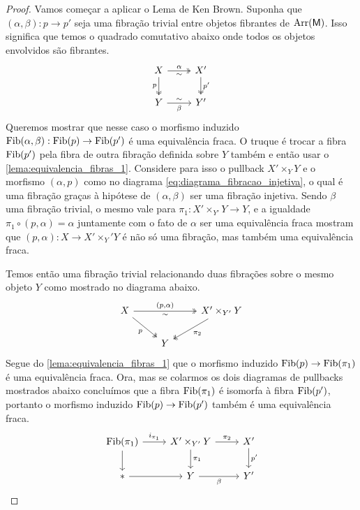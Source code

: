 \begin{proof}
  Vamos começar a aplicar o Lema de Ken Brown.
  Suponha que $(\alpha,\beta): p \to p'$ seja uma fibração trivial entre objetos fibrantes de $\mathrm{Arr}(\mathsf{M})$.
  Isso significa que temos o quadrado comutativo abaixo onde todos os objetos envolvidos são fibrantes.
  \begin{displaymath}
    \begin{tikzcd}
      X
      \arrow[r, two heads, "\alpha", "\sim" {swap}]
      \arrow[d, two heads, "p" swap]
      & X'
      \arrow[d, two heads, "p'"]
      \\ Y
      \arrow[r, "\sim", "\beta" {swap}]
      & Y'
    \end{tikzcd}
  \end{displaymath}
  Queremos mostrar que nesse caso o morfismo induzido $\mathrm{Fib}(\alpha,\beta): \mathrm{Fib}(p) \to \mathrm{Fib}(p')$ é uma equivalência fraca.
  O truque é trocar a fibra $\mathrm{Fib}(p')$ pela fibra de outra fibração definida sobre $Y$ também e então usar o \cref{lema:equivalencia_fibras_1}.
  Considere para isso o pullback $X' \times_{Y} Y$ e o morfismo $(\alpha,p)$ como no diagrama \eqref{eq:diagrama_fibracao_injetiva}, o qual é uma fibração graças à hipótese de $(\alpha,\beta)$ ser uma fibração injetiva.
  Sendo $\beta$ uma fibração trivial, o mesmo vale para $\pi_{1}: X' \times_{Y'} Y \to Y$, e a igualdade $\pi_{1} \circ (p,\alpha) = \alpha$ juntamente com o fato de $\alpha$ ser uma equivalência fraca mostram que $(p,\alpha): X \to X' \times_{Y}' Y$ é não só uma fibração, mas também uma equivalência fraca.

  Temos então uma fibração trivial relacionando duas fibrações sobre o mesmo objeto $Y$ como mostrado no diagrama abaixo.
  \begin{displaymath}
    \begin{tikzcd}
      X
      \arrow[rd, two heads, "p" swap]
      \arrow[rr, two heads, "{(p,\alpha)}", "\sim" {swap}]
      & & X' \times_{Y'} Y
      \arrow[ld, two heads, "\pi_{2}"]
      \\ & Y
    \end{tikzcd}
  \end{displaymath}
  Segue do \cref{lema:equivalencia_fibras_1} que o morfismo induzido $\mathrm{Fib}(p) \to \mathrm{Fib}(\pi_{1})$ é uma equivalência fraca.
  Ora, mas se colarmos os dois diagramas de pullbacks mostrados abaixo concluímos que a fibra $\mathrm{Fib}(\pi_{1})$ é isomorfa à fibra $\mathrm{Fib}(p')$, portanto o morfismo induzido $\mathrm{Fib}(p) \to \mathrm{Fib}(p')$ também é uma equivalência fraca.
  \begin{displaymath}
    \begin{tikzcd}
      \Fib(\pi_{1})
      \arrow[r, "i_{\pi_{1}}"]
      \arrow[d]
      & X' \times_{Y'} Y
      \arrow[r, "\pi_{2}"]
      \arrow[d, "\pi_{1}"]
      & X'
      \arrow[d, "p'"]
      \\ *
      \arrow[r]
      & Y
      \arrow[r, "\beta" swap]
      & Y'
    \end{tikzcd}
  \end{displaymath}


\end{proof}
